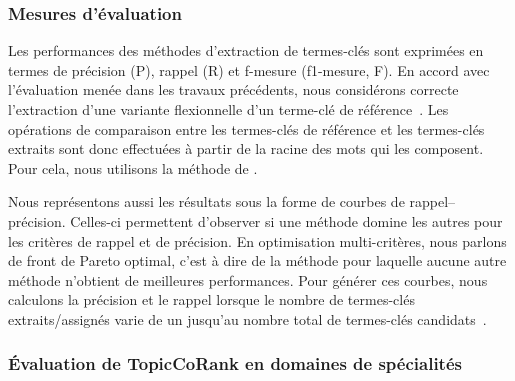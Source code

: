      \subsubsection{Mesures d'évaluation}
      \label{subsubsec:main-domain_specific_keyphrase_annotation-supervised_automatic_keyphrase_annotation-evaluation-evaluation_measures}
        Les performances des méthodes d'extraction de termes-clés sont exprimées
        en termes de précision (P), rappel (R) et f-mesure (f1-mesure, F). En
        accord avec l'évaluation menée dans les travaux précédents, nous
        considérons correcte l'extraction d'une variante flexionnelle d'un
        terme-clé de référence~\cite{kim2010semeval}. Les opérations de
        comparaison entre les termes-clés de référence et les termes-clés
        extraits sont donc effectuées à partir de la racine des mots qui les
        composent. Pour cela, nous utilisons la méthode de
        .

        Nous représentons aussi les résultats sous la forme de courbes de
        rappel--précision. Celles-ci permettent d'observer si une méthode domine
        les autres pour les critères de rappel et de précision. En optimisation
        multi-critères, nous parlons de front de Pareto optimal, c'est à dire de
        la méthode pour laquelle aucune autre méthode n'obtient de meilleures
        performances. Pour générer ces courbes, nous calculons la précision et
        le rappel lorsque  le nombre de termes-clés extraits/assignés varie de
        un jusqu'au nombre total de termes-clés
        candidats~\cite{hassan2010conundrums}.
      
      \subsubsection{Évaluation de TopicCoRank en domaines de spécialités}
      \label{subsubsec:main-domain_specific_keyphrase_annotation-supervised_automatic_keyphrase_annotation-evaluation-topiccorank_specific_domains}

